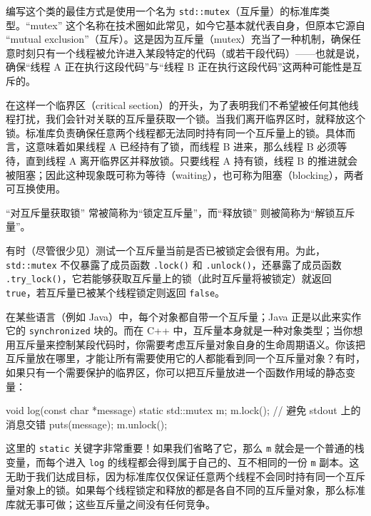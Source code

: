 编写这个类的最佳方式是使用一个名为 \texttt{std::\allowbreak{}mutex}（互斥量）的标准库类型。“mutex” 这个名称在技术圈如此常见，如今它基本就代表自身，但原本它源自 “mutual exclusion”（互斥）。这是因为互斥量（mutex）充当了一种机制，确保任意时刻只有一个线程被允许进入某段特定的代码（或若干段代码）——也就是说，确保“线程 A 正在执行这段代码”与“线程 B 正在执行这段代码”这两种可能性是互斥的。

在这样一个临界区（critical section）的开头，为了表明我们不希望被任何其他线程打扰，我们会针对关联的互斥量获取一个锁。当我们离开临界区时，就释放这个锁。标准库负责确保任意两个线程都无法同时持有同一个互斥量上的锁。具体而言，这意味着如果线程 A 已经持有了锁，而线程 B 进来，那么线程 B 必须等待，直到线程 A 离开临界区并释放锁。只要线程 A 持有锁，线程 B 的推进就会被阻塞；因此这种现象既可称为等待（waiting），也可称为阻塞（blocking），两者可互换使用。

“对互斥量获取锁” 常被简称为“锁定互斥量”，而“释放锁” 则被简称为“解锁互斥量”。

有时（尽管很少见）测试一个互斥量当前是否已被锁定会很有用。为此，\texttt{std::\allowbreak{}mutex} 不仅暴露了成员函数 \texttt{.lock(\allowbreak{})\allowbreak{}} 和 \texttt{.unlock(\allowbreak{})\allowbreak{}}，还暴露了成员函数 \texttt{.try\_\allowbreak{}lock(\allowbreak{})\allowbreak{}}，它若能够获取互斥量上的锁（此时互斥量将被锁定）就返回 \texttt{true}，若互斥量已被某个线程锁定则返回 \texttt{false}。

在某些语言（例如 Java）中，每个对象都自带一个互斥量；Java 正是以此来实作它的 \texttt{synchronized} 块的。而在 C++ 中，互斥量本身就是一种对象类型；当你想用互斥量来控制某段代码时，你需要考虑互斥量对象自身的生命周期语义。你该把互斥量放在哪里，才能让所有需要使用它的人都能看到同一个互斥量对象？有时，如果只有一个需要保护的临界区，你可以把互斥量放进一个函数作用域的静态变量：

\begin{codebox}[cpp]
    void log(const char *message)
    {
      static std::mutex m;
      m.lock(); // 避免 stdout 上的消息交错
      puts(message);
      m.unlock();
    }
\end{codebox}

这里的 \texttt{static} 关键字非常重要！如果我们省略了它，那么 \texttt{m} 就会是一个普通的栈变量，而每个进入 \texttt{log} 的线程都会得到属于自己的、互不相同的一份 \texttt{m} 副本。这无助于我们达成目标，因为标准库仅仅保证任意两个线程不会同时持有同一个互斥量对象上的锁。如果每个线程锁定和释放的都是各自不同的互斥量对象，那么标准库就无事可做；这些互斥量之间没有任何竞争。

